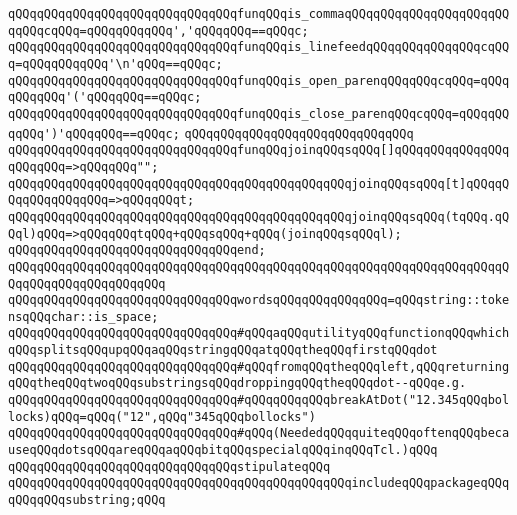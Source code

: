 \verb|qQQqqQQqqQQqqQQqqQQqqQQqqQQqqQQqfunqQQqis_commaqQQqqQQqqQQqqQQqqQQqqQQqqQQqcqQQq=qQQqqQQqqQQq','qQQqqQQq==qQQqc;|\newline
\verb|qQQqqQQqqQQqqQQqqQQqqQQqqQQqqQQqfunqQQqis_linefeedqQQqqQQqqQQqqQQqcqQQq=qQQqqQQqqQQq'\n'qQQq==qQQqc;|\newline
\verb|qQQqqQQqqQQqqQQqqQQqqQQqqQQqqQQqfunqQQqis_open_parenqQQqqQQqcqQQq=qQQqqQQqqQQq'('qQQqqQQq==qQQqc;|\newline
\verb|qQQqqQQqqQQqqQQqqQQqqQQqqQQqqQQqfunqQQqis_close_parenqQQqcqQQq=qQQqqQQqqQQq')'qQQqqQQq==qQQqc;|\newline
\verb|qQQqqQQqqQQqqQQqqQQqqQQqqQQqqQQq|\newline
\verb|qQQqqQQqqQQqqQQqqQQqqQQqqQQqqQQqfunqQQqjoinqQQqsqQQq[]qQQqqQQqqQQqqQQqqQQqqQQq=>qQQqqQQq"";|\newline
\verb|qQQqqQQqqQQqqQQqqQQqqQQqqQQqqQQqqQQqqQQqqQQqqQQqjoinqQQqsqQQq[t]qQQqqQQqqQQqqQQqqQQq=>qQQqqQQqt;|\newline
\verb|qQQqqQQqqQQqqQQqqQQqqQQqqQQqqQQqqQQqqQQqqQQqqQQqjoinqQQqsqQQq(tqQQq.qQQql)qQQq=>qQQqqQQqtqQQq+qQQqsqQQq+qQQq(joinqQQqsqQQql);|\newline
\verb|qQQqqQQqqQQqqQQqqQQqqQQqqQQqqQQqend;|\newline
\verb|qQQqqQQqqQQqqQQqqQQqqQQqqQQqqQQqqQQqqQQqqQQqqQQqqQQqqQQqqQQqqQQqqQQqqQQqqQQqqQQqqQQqqQQqqQQq|\newline
\verb|qQQqqQQqqQQqqQQqqQQqqQQqqQQqqQQqwordsqQQqqQQqqQQqqQQq=qQQqstring::tokensqQQqchar::is_space;|\newline
\newline
\verb|qQQqqQQqqQQqqQQqqQQqqQQqqQQqqQQq#qQQqaqQQqutilityqQQqfunctionqQQqwhichqQQqsplitsqQQqupqQQqaqQQqstringqQQqatqQQqtheqQQqfirstqQQqdot|\newline
\verb|qQQqqQQqqQQqqQQqqQQqqQQqqQQqqQQq#qQQqfromqQQqtheqQQqleft,qQQqreturningqQQqtheqQQqtwoqQQqsubstringsqQQqdroppingqQQqtheqQQqdot--qQQqe.g.|\newline
\verb|qQQqqQQqqQQqqQQqqQQqqQQqqQQqqQQq#qQQqqQQqqQQqbreakAtDot("12.345qQQqbollocks)qQQq=qQQq("12",qQQq"345qQQqbollocks")|\newline
\verb|qQQqqQQqqQQqqQQqqQQqqQQqqQQqqQQq#qQQq(NeededqQQqquiteqQQqoftenqQQqbecauseqQQqdotsqQQqareqQQqaqQQqbitqQQqspecialqQQqinqQQqTcl.)qQQq|\newline
\newline
\verb|qQQqqQQqqQQqqQQqqQQqqQQqqQQqqQQqstipulateqQQq|\newline
\verb|qQQqqQQqqQQqqQQqqQQqqQQqqQQqqQQqqQQqqQQqqQQqqQQqincludeqQQqpackageqQQqqQQqqQQqsubstring;qQQq|\newline

